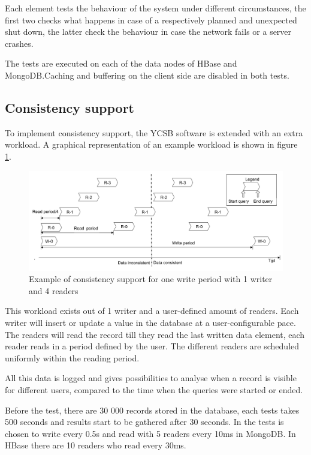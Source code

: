 \documentclass[10pt,conference,letterpaper]{IEEEtran}
\begin{document}
Each element tests the behaviour of the system under different circumstances, the first two checks what happens in case of a respectively planned and unexpected shut down, the latter check the behaviour in case the network fails or a server crashes.

The tests are executed on each of the data nodes of HBase and MongoDB.Caching and buffering on the client side are disabled in both tests. 

\subsection{Consistency support}
To implement consistency support, the YCSB software is extended with an extra workload. A graphical representation of an example workload is shown in figure \ref{fig:consistence-method}. 
\begin{figure}[ht]
\centering
\includegraphics[width=\linewidth]{../img/Consistency-test-period}
\caption{Example of consistency support for one write period with 1 writer and 4 readers}
\label{fig:consistence-method}
\end{figure}
This workload exists out of 1 writer and a user-defined amount of readers.  Each writer will insert or update a value in the database at a user-configurable pace. The readers will read the record till they read the last written data element, each reader reads in a period defined by the user. The different readers are scheduled uniformly within the reading period. 

All this data is logged and gives possibilities to analyse when a record is visible for different users, compared to the time when the queries were started or ended. 

Before the test, there are 30 000 records stored in the database, each tests takes 500 seconds and results start to be gathered after 30 seconds. In the tests is chosen to write every 0.5s and read with 5 readers every 10ms in MongoDB. In HBase there are 10 readers who read every 30ms.  
 
\end{document}
